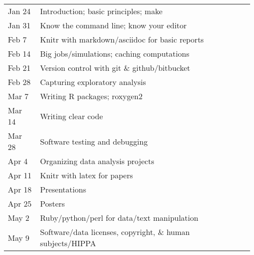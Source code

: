 \documentclass[11pt]{article}
\begin{document}
\renewcommand{\arraystretch}{1.2}
\begin{tabular}{l@{\hspace{5mm}}l}
Jan 24 & Introduction; basic principles; make \\
Jan 31 & Know the command line; know your editor \\
Feb 7  & Knitr with markdown/asciidoc for basic reports \\
Feb 14 & Big jobs/simulations; caching computations \\
Feb 21 & Version control with git \& github/bitbucket \\
Feb 28 & Capturing exploratory analysis \\
Mar 7  & Writing R packages; roxygen2 \\
Mar 14 & Writing clear code \\
Mar 28 & Software testing and debugging \\
Apr 4 &  Organizing data analysis projects \\
Apr 11 & Knitr with latex for papers \\
Apr 18 & Presentations \\
Apr 25 & Posters \\
May 2 &  Ruby/python/perl for data/text manipulation \\
May 9 &  Software/data licenses, copyright, \& human subjects/HIPPA \\
\end{tabular}
\end{document}
